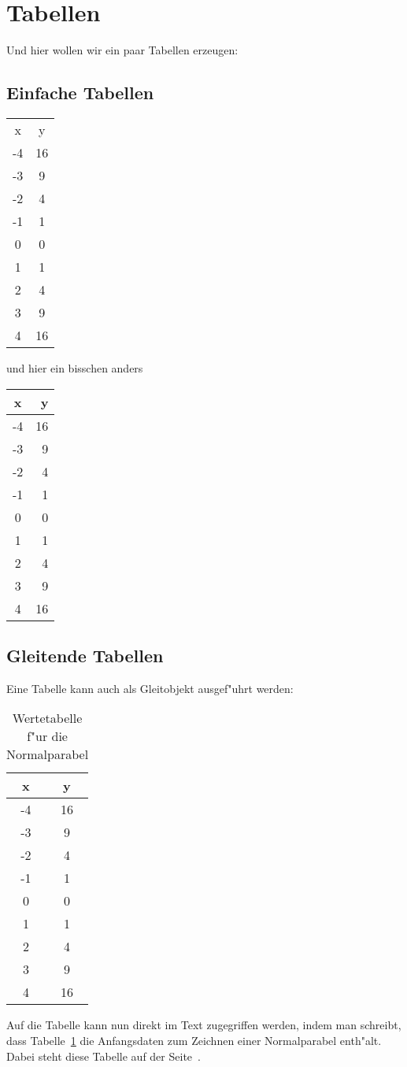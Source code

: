 \section{Tabellen}

Und hier wollen wir ein paar Tabellen erzeugen:

\subsection{Einfache Tabellen}

\begin{tabular}{cc}
 x & y \\
 -4 & 16 \\
 -3 & 9 \\
 -2 & 4 \\
 -1 & 1 \\
  0 & 0 \\
  1 & 1 \\
  2 & 4 \\
  3 & 9 \\
  4 & 16 \\
\end{tabular}


  und hier ein bisschen anders

\begin{tabular}{|c|r|}
\hline
 x & y \\
\hline
 -4 & 16 \\
 -3 & 9 \\
 -2 & 4 \\
 -1 & 1 \\
  0 & 0 \\
  1 & 1 \\
  2 & 4 \\
  3 & 9 \\
  4 & 16 \\
\hline
\end{tabular}

\subsection{Gleitende Tabellen}

Eine Tabelle kann auch als Gleitobjekt ausgef"uhrt werden:

\begin{table}[htbp]
\begin{center}
\begin{tabular}{|cc|}
\hline
 x & y \\
\hline
 -4 & 16 \\
 -3 & 9 \\
 -2 & 4 \\
 -1 & 1 \\
  0 & 0 \\
  1 & 1 \\
  2 & 4 \\
  3 & 9 \\
  4 & 16 \\
\hline
\end{tabular}
\end{center}
\caption{Wertetabelle f"ur die Normalparabel}\label{tab:einfach1}
\end{table}



Auf die Tabelle kann nun direkt im Text zugegriffen werden, indem man schreibt, dass Tabelle~\ref{tab:einfach1} die Anfangsdaten zum Zeichnen einer Normalparabel enth"alt. Dabei steht diese Tabelle auf der Seite~\pageref{tab:einfach1}.
